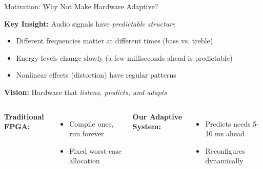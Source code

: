\documentclass[aspectratio=169,11pt]{beamer}
\begin{document}
\begin{frame}{Motivation: Why Not Make Hardware Adaptive?}

\textbf{Key Insight:} Audio signals have \emph{predictable structure}
\begin{itemize}
    \item Different frequencies matter at different times (bass vs. treble)
    \item Energy levels change slowly (a few milliseconds ahead is predictable)
    \item Nonlinear effects (distortion) have regular patterns
\end{itemize}

\vspace{0.3cm}

\textbf{Vision:} Hardware that \emph{listens, predicts, and adapts}

\vspace{0.2cm}

\begin{columns}[T]
\textbf{Traditional FPGA:}
\begin{itemize}
    \item Compile once, run forever
    \item Fixed worst-case allocation
\end{itemize}

\vspace{0.2cm}


\textbf{Our Adaptive System:}
\begin{itemize}
    \item Predicts needs 5-10 ms ahead
    \item Reconfigures dynamically
\end{itemize}

\vspace{0.2cm}


\end{columns}

\end{frame}
\end{document}
